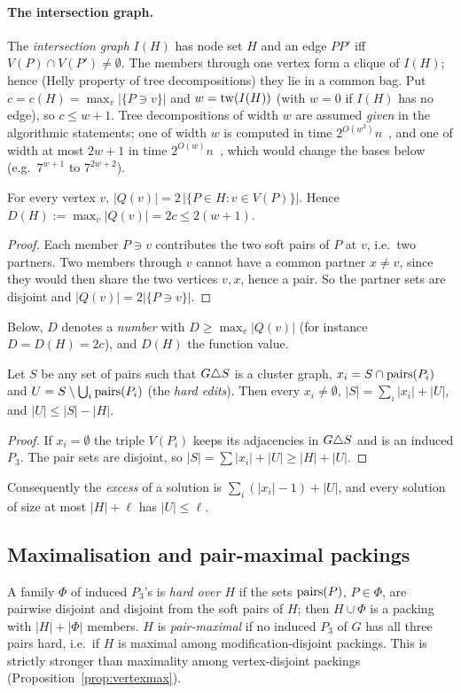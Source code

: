 \paragraph{The intersection graph.}
The \emph{intersection graph} $I(H)$ has node set $H$ and an edge $PP'$ iff $V(P)\cap V(P')\ne\emptyset$. The members through one vertex form a clique of $I(H)$; hence (Helly property of tree decompositions) they lie in a common bag. Put $c=c(H)=\max_v|\{P\ni v\}|$ and $w=\mathrm{tw}(I(H))$ (with $w=0$ if $I(H)$ has no edge), so $c\le w+1$. Tree decompositions of width $w$ are assumed \emph{given} in the algorithmic statements; one of width $w$ is computed in time $2^{O(w^3)}n$~\cite{Bod96,Cygan15}, and one of width at most $2w+1$ in time $2^{O(w)}n$~\cite{Kor21}, which would change the bases below (e.g.\ $7^{w+1}$ to $7^{2w+2}$).

\begin{lemma}[Degrees]\label{lem:deg}
For every vertex $v$, $|Q(v)|=2\,|\{P\in H:v\in V(P)\}|$. Hence $D(H):=\max_v|Q(v)|=2c\le 2(w+1)$.
\end{lemma}
\begin{proof}
Each member $P\ni v$ contributes the two soft pairs of $P$ at $v$, i.e.\ two partners. Two members through $v$ cannot have a common partner $x\ne v$, since they would then share the two vertices $v,x$, hence a pair. So the partner sets are disjoint and $|Q(v)|=2|\{P\ni v\}|$.
\end{proof}
Below, $D$ denotes a \emph{number} with $D\ge\max_v|Q(v)|$ (for instance $D=D(H)=2c$), and $D(H)$ the function value.

\begin{lemma}\label{lem:decomp}
Let $S$ be any set of pairs such that $G\triangle S$ is a cluster graph, $x_i=S\cap\mathrm{pairs}(P_i)$ and $U=S\setminus\bigcup_i\mathrm{pairs}(P_i)$ (the \emph{hard edits}). Then every $x_i\neq\emptyset$, $|S|=\sum_i|x_i|+|U|$, and $|U|\le|S|-|H|$.
\end{lemma}
\begin{proof}
If $x_i=\emptyset$ the triple $V(P_i)$ keeps its adjacencies in $G\triangle S$ and is an induced $P_3$. The pair sets are disjoint, so $|S|=\sum|x_i|+|U|\ge|H|+|U|$.
\end{proof}
Consequently the \emph{excess} of a solution is $\sum_i(|x_i|-1)+|U|$, and every solution of size at most $|H|+\ell$ has $|U|\le\ell$.

\subsection{Maximalisation and pair-maximal packings}
A family $\Phi$ of induced $P_3$'s is \emph{hard over $H$} if the sets $\mathrm{pairs}(P)$, $P\in\Phi$, are pairwise disjoint and disjoint from the soft pairs of $H$; then $H\cup\Phi$ is a packing with $|H|+|\Phi|$ members. $H$ is \emph{pair-maximal} if no induced $P_3$ of $G$ has all three pairs hard, i.e.\ if $H$ is maximal among modification-disjoint packings. This is strictly stronger than maximality among vertex-disjoint packings (Proposition~\ref{prop:vertexmax}).

